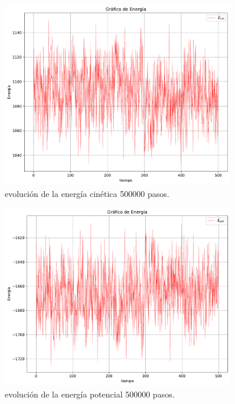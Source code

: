 \documentclass[11pt]{article} %
\begin{document}
\begin{figure}[h!] \centering
	\includegraphics[width=0.9\textwidth]{../../Graficas/Ecin-equilibra-500K.pdf}
	\caption{evolución de la energía cinética 500000 pasos.}
	\label{Fig:05}
\end{figure}	

\begin{figure}[h!] \centering
	\includegraphics[width=0.9\textwidth]{../../Graficas/Epot-equilibra-500K.pdf}
	\caption{evolución de la energía potencial 500000 pasos.}
	\label{Fig:06}
\end{figure}	


	
\end{document}
